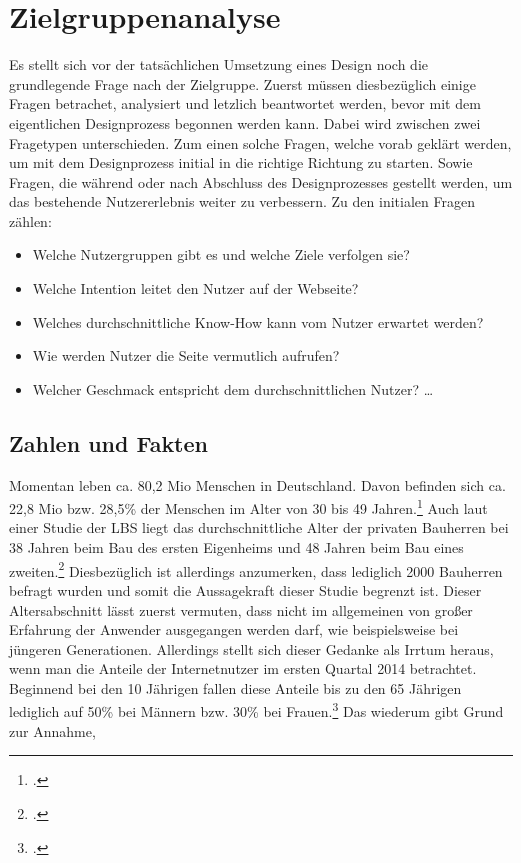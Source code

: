 \section{Zielgruppenanalyse}
Es stellt sich vor der tatsächlichen Umsetzung eines Design noch die grundlegende Frage nach der Zielgruppe. Zuerst müssen diesbezüglich einige Fragen betrachet, analysiert und letzlich beantwortet werden, bevor mit dem eigentlichen Designprozess begonnen werden kann. Dabei wird zwischen zwei Fragetypen unterschieden. Zum einen solche Fragen, welche vorab geklärt werden, um mit dem Designprozess initial in die richtige Richtung zu starten. Sowie Fragen, die während oder nach Abschluss des Designprozesses gestellt werden, um das bestehende Nutzererlebnis weiter zu verbessern.
Zu den initialen Fragen zählen: 
\begin{itemize}
	\item Welche Nutzergruppen gibt es und welche Ziele verfolgen sie?
	\item Welche Intention leitet den Nutzer auf der Webseite?
	\item Welches durchschnittliche Know-How kann vom Nutzer erwartet werden? 
	\item Wie werden Nutzer die Seite vermutlich aufrufen? 
	\item Welcher Geschmack entspricht dem durchschnittlichen Nutzer? \ldots
\end{itemize}
\subsection{Zahlen und Fakten}
Momentan leben ca. 80,2 Mio Menschen in Deutschland. Davon befinden sich ca. 22,8 Mio bzw. 28,5\% der Menschen im Alter von 30 bis 49 Jahren.\footcite[vgl.][]{zensus2011:alter} Auch laut einer Studie der LBS liegt das durchschnittliche Alter der privaten Bauherren bei 38 Jahren beim Bau des ersten Eigenheims und 48 Jahren beim Bau eines zweiten.\footcite[vgl.][]{lbs} Diesbezüglich ist allerdings anzumerken, dass lediglich 2000 Bauherren befragt wurden und somit die Aussagekraft dieser Studie begrenzt ist. 
Dieser Altersabschnitt lässt zuerst vermuten, dass nicht im allgemeinen von großer Erfahrung der Anwender ausgegangen werden darf, wie beispielsweise bei jüngeren Generationen. Allerdings stellt sich dieser Gedanke als Irrtum heraus, wenn man die Anteile der Internetnutzer im ersten Quartal 2014 betrachtet. Beginnend bei den 10 Jährigen fallen diese Anteile bis zu den 65 Jährigen lediglich auf 50\% bei Männern bzw. 30\% bei Frauen.\footcite[vgl.][]{stabu} Das wiederum gibt Grund zur Annahme, 

